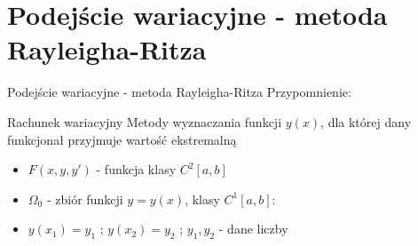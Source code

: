 \section{Podejście wariacyjne - metoda Rayleigha-Ritza}

	
	\begin{frame}{Podejście wariacyjne - metoda Rayleigha-Ritza}
		Przypomnienie:
		
		\begin{block}{Rachunek wariacyjny}
			Metody wyznaczania funkcji $y(x)$, dla której dany funkcjonał przyjmuje wartość ekstremalną
		\end{block}
		
		\begin{itemize}
			\item $F(x,y,y')$ - funkcja klasy $C^2[a,b]$
					
			\item $\Omega_0$ - zbiór funkcji $y = y(x)$, klasy $C^1[a,b]$:
					
			\item $y(x_1) = y_1$ ; $y(x_2) = y_2$ ; $y_1, y_2$ - dane liczby
		\end{itemize}
		
	\end{frame}

	
